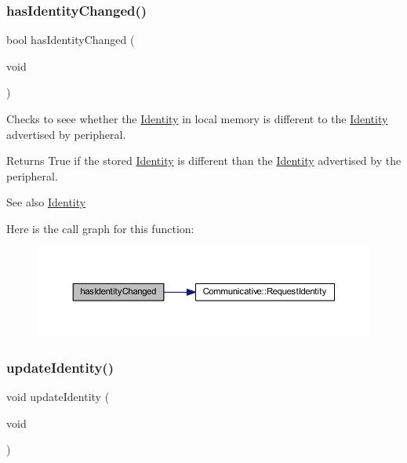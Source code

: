 \subsubsection{\texorpdfstring{hasIdentityChanged()}{hasIdentityChanged()}}
{\footnotesize\ttfamily bool has\+Identity\+Changed (\begin{DoxyParamCaption}\item[{void}]{ }\end{DoxyParamCaption})}



Checks to seee whether the \mbox{\hyperlink{struct_identity}{Identity}} in local memory is different to the \mbox{\hyperlink{struct_identity}{Identity}} advertised by peripheral. 

\begin{DoxyReturn}{Returns}
True if the stored \mbox{\hyperlink{struct_identity}{Identity}} is different than the \mbox{\hyperlink{struct_identity}{Identity}} advertised by the peripheral. 
\end{DoxyReturn}
\begin{DoxySeeAlso}{See also}
\mbox{\hyperlink{struct_identity}{Identity}} 
\end{DoxySeeAlso}
Here is the call graph for this function\+:
\nopagebreak
\begin{figure}[H]
\begin{center}
\leavevmode
\includegraphics[width=350pt]{class_identifiable_adbc1a3f62e543a0df002a43413998a26_cgraph}
\end{center}
\end{figure}
\mbox{\label{class_identifiable_ae99f8914426041ea02932d0ed00b29c3}} 
\subsubsection{\texorpdfstring{updateIdentity()}{updateIdentity()}}
{\footnotesize\ttfamily void update\+Identity (\begin{DoxyParamCaption}\item[{void}]{ }\end{DoxyParamCaption})}



